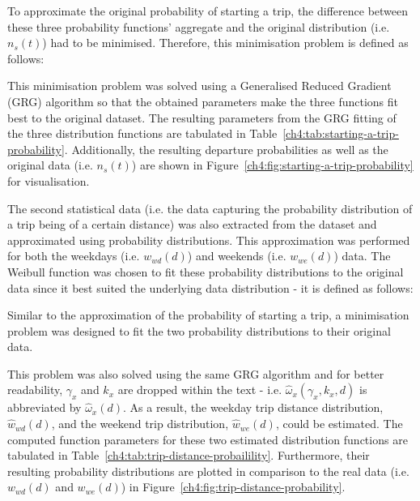 

To approximate the original probability of starting a trip, the difference between these three probability functions' aggregate and the original distribution (i.e. $n_s(t)$) had to be minimised.
Therefore, this minimisation problem is defined as follows:



This minimisation problem was solved using a Generalised Reduced Gradient (GRG) algorithm so that the obtained parameters make the three functions fit best to the original dataset.
The resulting parameters from the GRG fitting of the three distribution functions are tabulated in Table~\ref{ch4:tab:starting-a-trip-probability}.
Additionally, the resulting departure probabilities as well as the original data (i.e. $n_s(t)$) are shown in Figure~\ref{ch4:fig:starting-a-trip-probability} for visualisation.





The second statistical data (i.e. the data capturing the probability distribution of a trip being of a certain distance) was also extracted from the dataset and approximated using probability distributions.
This approximation was performed for both the weekdays (i.e. $w_{wd}(d)$) and weekends (i.e. $w_{we}(d)$) data.
The Weibull function was chosen to fit these probability distributions to the original data since it best suited the underlying data distribution - it is defined as follows:



Similar to the approximation of the probability of starting a trip, a minimisation problem was designed to fit the two probability distributions to their original data.



This problem was also solved using the same GRG algorithm and for better readability, $\gamma_x$ and $k_x$ are dropped within the text - i.e. $\hat{\omega}_x(\gamma_x,k_x,d)$ is abbreviated by $\hat{\omega}_x(d)$.
As a result, the weekday trip distance distribution, $\hat{w}_{wd}(d)$, and the weekend trip distribution, $\hat{w}_{we}(d)$, could be estimated.
The computed function parameters for these two estimated distribution functions are tabulated in Table~\ref{ch4:tab:trip-distance-probailility}.
Furthermore, their resulting probability distributions are plotted in comparison to the real data (i.e. $w_{wd}(d)$ and $w_{we}(d)$) in Figure~\ref{ch4:fig:trip-distance-probability}.

